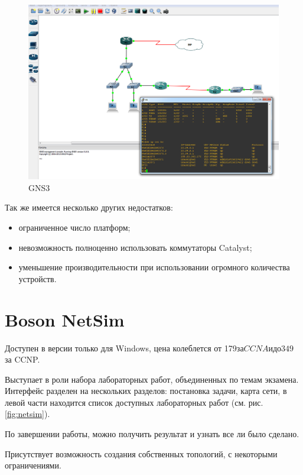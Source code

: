 \documentclass[a4paper,14pt]{extreport}
\begin{document}
	\begin{figure}[h]
		\centering
		\includegraphics[width=0.9\linewidth]{pic/gns3}
		\caption{GNS3}
		\label{fig:gns3}
	\end{figure}
	
	
	
	Так же имеется несколько других недостатков:
	\begin{itemize}
		\item ограниченное число платформ;
		\item невозможность полноценно использовать коммутаторы Catalyst;
		\item уменьшение производительности при использовании огромного количества устройств.
	\end{itemize}
		
	\section{Boson NetSim}
	
	Доступен в версии только для Windows, цена колеблется от 179$ за CCNA
	и до 349$ за CCNP.
	
	Выступает в роли набора лабораторных работ, объединенных по темам экзамена. Интерфейс разделен на нескольких разделов: постановка задачи, карта сети, в
	левой части находится список доступных лабораторных работ (см. рис. \ref{fig:netsim}).
	
	По завершении работы, можно получить результат и узнать все ли было
	сделано.
	
	Присутствует возможность создания собственных топологий, с некоторыми
	ограничениями.
	
\end{document}
